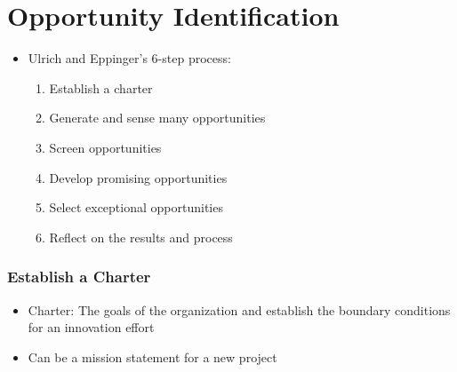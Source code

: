 \documentclass[openany,12pt,a4paper]{book}
\begin{document}
\section{Opportunity Identification}
\begin{itemize}
    \item Ulrich and Eppinger's 6-step process:
    \begin{enumerate}
        \item Establish a charter
        \item Generate and sense many opportunities
        \item Screen opportunities
        \item Develop promising opportunities
        \item Select exceptional opportunities
        \item Reflect on the results and process
    \end{enumerate}
\end{itemize}

\subsubsection{Establish a Charter}
\begin{itemize}
    \item Charter: The goals of the organization and establish the boundary conditions for an innovation effort
    \item Can be a mission statement for a new project
\end{itemize}
\end{document}
